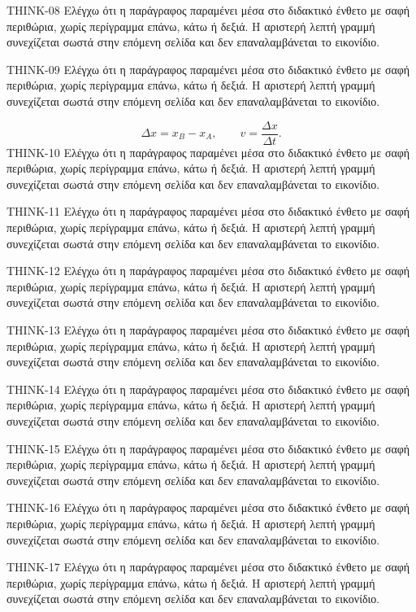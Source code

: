 \begin{ThinkBox}
THINK-08 Ελέγχω ότι η παράγραφος παραμένει μέσα στο διδακτικό ένθετο με σαφή περιθώρια, χωρίς περίγραμμα επάνω, κάτω ή δεξιά. Η αριστερή λεπτή γραμμή συνεχίζεται σωστά στην επόμενη σελίδα και δεν επαναλαμβάνεται το εικονίδιο.\par
THINK-09 Ελέγχω ότι η παράγραφος παραμένει μέσα στο διδακτικό ένθετο με σαφή περιθώρια, χωρίς περίγραμμα επάνω, κάτω ή δεξιά. Η αριστερή λεπτή γραμμή συνεχίζεται σωστά στην επόμενη σελίδα και δεν επαναλαμβάνεται το εικονίδιο.\par
\[\Delta x=x_B-x_A,\qquad v=\frac{\Delta x}{\Delta t}.\]
THINK-10 Ελέγχω ότι η παράγραφος παραμένει μέσα στο διδακτικό ένθετο με σαφή περιθώρια, χωρίς περίγραμμα επάνω, κάτω ή δεξιά. Η αριστερή λεπτή γραμμή συνεχίζεται σωστά στην επόμενη σελίδα και δεν επαναλαμβάνεται το εικονίδιο.\par
THINK-11 Ελέγχω ότι η παράγραφος παραμένει μέσα στο διδακτικό ένθετο με σαφή περιθώρια, χωρίς περίγραμμα επάνω, κάτω ή δεξιά. Η αριστερή λεπτή γραμμή συνεχίζεται σωστά στην επόμενη σελίδα και δεν επαναλαμβάνεται το εικονίδιο.\par
THINK-12 Ελέγχω ότι η παράγραφος παραμένει μέσα στο διδακτικό ένθετο με σαφή περιθώρια, χωρίς περίγραμμα επάνω, κάτω ή δεξιά. Η αριστερή λεπτή γραμμή συνεχίζεται σωστά στην επόμενη σελίδα και δεν επαναλαμβάνεται το εικονίδιο.\par
THINK-13 Ελέγχω ότι η παράγραφος παραμένει μέσα στο διδακτικό ένθετο με σαφή περιθώρια, χωρίς περίγραμμα επάνω, κάτω ή δεξιά. Η αριστερή λεπτή γραμμή συνεχίζεται σωστά στην επόμενη σελίδα και δεν επαναλαμβάνεται το εικονίδιο.\par
THINK-14 Ελέγχω ότι η παράγραφος παραμένει μέσα στο διδακτικό ένθετο με σαφή περιθώρια, χωρίς περίγραμμα επάνω, κάτω ή δεξιά. Η αριστερή λεπτή γραμμή συνεχίζεται σωστά στην επόμενη σελίδα και δεν επαναλαμβάνεται το εικονίδιο.\par
THINK-15 Ελέγχω ότι η παράγραφος παραμένει μέσα στο διδακτικό ένθετο με σαφή περιθώρια, χωρίς περίγραμμα επάνω, κάτω ή δεξιά. Η αριστερή λεπτή γραμμή συνεχίζεται σωστά στην επόμενη σελίδα και δεν επαναλαμβάνεται το εικονίδιο.\par
THINK-16 Ελέγχω ότι η παράγραφος παραμένει μέσα στο διδακτικό ένθετο με σαφή περιθώρια, χωρίς περίγραμμα επάνω, κάτω ή δεξιά. Η αριστερή λεπτή γραμμή συνεχίζεται σωστά στην επόμενη σελίδα και δεν επαναλαμβάνεται το εικονίδιο.\par
THINK-17 Ελέγχω ότι η παράγραφος παραμένει μέσα στο διδακτικό ένθετο με σαφή περιθώρια, χωρίς περίγραμμα επάνω, κάτω ή δεξιά. Η αριστερή λεπτή γραμμή συνεχίζεται σωστά στην επόμενη σελίδα και δεν επαναλαμβάνεται το εικονίδιο.\par

\end{ThinkBox}
